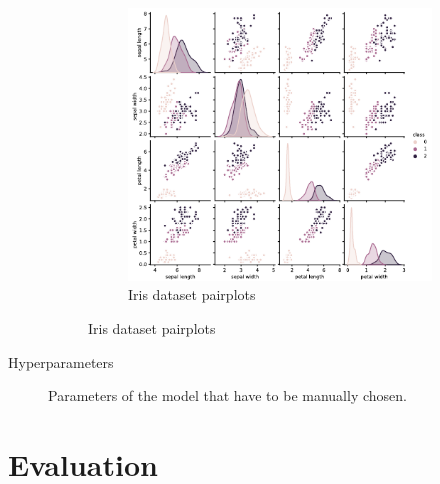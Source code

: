 \begin{description}
\begin{figure}[H]
\begin{subfigure}{.5\textwidth}
                \centering
                \includegraphics[width=\linewidth]{img/_iris_pairplot.pdf}
                \caption{Iris dataset pairplots}
            \end{subfigure}
        \end{figure}

    \item[Hyperparameters]
        Parameters of the model that have to be manually chosen.
\end{description}


\section{Evaluation}

